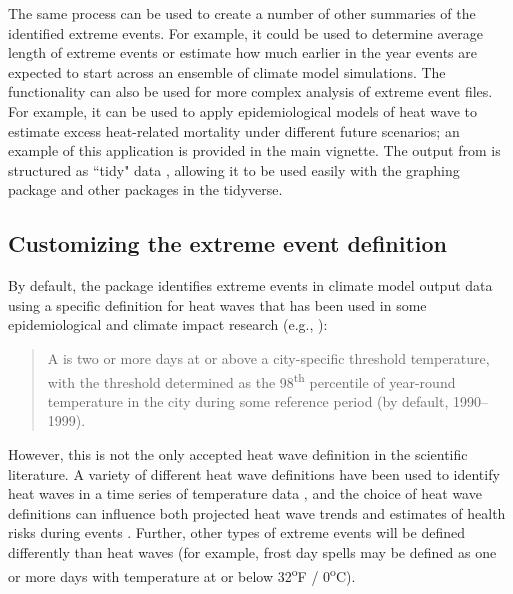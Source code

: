 The same process can be used to create a number of other summaries of
the identified extreme events. For example, it could be used to
determine average length of extreme events or estimate how much earlier
in the year events are expected to start across an ensemble of climate
model simulations. The functionality can also be used for more complex
analysis of extreme event files. For example, it can be used to apply
epidemiological models of heat wave to estimate excess heat-related
mortality under different future scenarios; an example of this
application is provided in the main  vignette. The
output from  is structured as ``tidy" data
\citep{wickham2014tidy}, allowing it to be used easily with the graphing
package  \citep{ggplot2} and other packages in the
tidyverse.

\subsection{Customizing the extreme event
definition}\label{customizing-the-extreme-event-definition}

By default, the package identifies extreme events in climate model
output data using a specific definition for heat waves that has been
used in some epidemiological and climate impact research (e.g.,
\citet{anderson2009weather}):

\begin{quote}
A  is two or more days at or above a city-specific
threshold temperature, with the threshold determined as the
98\textsuperscript{th} percentile of year-round temperature in the city
during some reference period (by default, 1990--1999).
\end{quote}

\noindent However, this is not the only accepted heat wave definition in
the scientific literature. A variety of different heat wave definitions
have been used to identify heat waves in a time series of temperature
data
\citep{smith2013heat, kent2014heat, chen2015influence, anderson2009weather},
and the choice of heat wave definitions can influence both projected
heat wave trends \citep{smith2013heat} and estimates of health risks
during events
\citep{chen2015influence, kent2014heat, anderson2009weather}. Further,
other types of extreme events will be defined differently than heat
waves (for example, frost day spells may be defined as one or more days
with temperature at or below 32\textsuperscript{o}F /
0\textsuperscript{o}C).

